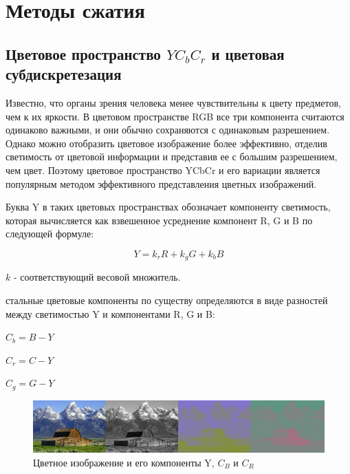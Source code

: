 \section*{Методы сжатия}

\subsection*{Цветовое пространство $YC_bC_r$ и цветовая субдискретезация}

Известно, что органы зрения человека менее чувствительны к цвету предметов, чем к их яркости. В цветовом пространстве RGB все три компонента считаются одинаково важными, и они обычно сохраняются с одинаковым разрешением. Однако можно отобразить цветовое изображение более эффективно, отделив светимость от цветовой информации и представив ее с большим разрешением, чем цвет. Поэтому цветовое пространство YCbCr и его вариации является популярным методом эффективного представления цветных изображений. 

Буква Y в таких цветовых пространствах обозначает компоненту светимость, которая вычисляется как взвешенное усреднение компонент R, G и B по следующей формуле: 

\begin{displaymath}
	Y = k_rR + k_gG + k_bB
\end{displaymath}

$k$ - соответствующий весовой множитель.

стальные цветовые компоненты по существу определяются в виде разностей между светимостью Y и компонентами R, G и B: 

\begin{center}
	$C_b = B - Y$ 

	$C_r = C - Y$ 

	$C_g = G - Y$ 
\end{center}

\begin{figure}[H]
	\begin{center}
		\includegraphics[scale=0.35]{pics/YCbCr/YCbCr_separation_h.jpg}
		\caption{Цветное изображение и его компоненты Y, $C_B$ и $C_R$} 
		\label{pic:YCbCr:separation}
	\end{center}
\end{figure}

